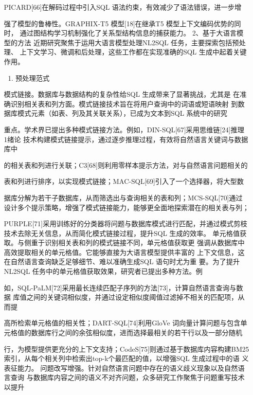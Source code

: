 \documentclass[12pt,a4paper,openright,UTF8]{ctexbook}
\begin{document}
PICARD[66]在解码过程中引入SQL 语法约束，有效减少了语法错误，进一步增

强了模型的鲁棒性。GRAPHIX-T5 模型[18]在继承T5 模型上下文编码优势的同时， 通过图结构学习机制强化了关系型结构信息的捕获能力。 2、基于大语言模型的方法 近期研究聚焦于运用大语言模型处理NL2SQL 任务，主要探索包括预处理、 上下文学习、微调和后处理，这些工作都在实现准确的SQL 生成中起着关键作用。

\begin{enumerate}[label=(\arabic*)]
\item 预处理范式
\end{enumerate}
模式链接。数据库与数据结构的复杂性给SQL 生成带来了显著挑战，尤其是 在准确识别相关表和列方面。模式链接技术旨在将用户查询中的词语或短语映射 到数据库模式元素（如表、列及其关联关系），已成为文本到SQL 系统中的研究

重点。学术界已提出多种模式链接方法。例如，DIN-SQL[67]采用思维链[24]推理 1绪论 技术构建模式链接提示，通过逐步推理过程，有效将自然语言关键词与数据库中

的相关表和列进行关联；C3[68]则利用零样本提示方法，对与自然语言问题相关的

表和列进行排序，以实现模式链接；MAC-SQL[69]引入了一个选择器，将大型数

据库分解为若干子数据库，从而筛选出与查询相关的表和列；MCS-SQL[70]通过 设计多个提示策略，增强了模式链接能力，能够更全面地探索潜在的相关表与列；

PURPLE[71]采用训练好的分类器将问题与数据库模式进行匹配，并通过模式剪枝 技术去除无关信息，从而简化模式链接过程，提升SQL 生成的效率。 单元格值获取。与侧重于识别相关表和列的模式链接不同，单元格值获取更 强调从数据库中高效提取相关的单元格值。它能够直接为大语言模型提供丰富的 上下文信息，这在自然语言查询缺乏足够细节、难以准确生成SQL 语句时尤为重 要。为了提升NL2SQL 任务中的单元格值获取效果，研究者已提出多种方法。例

如，SQL-PaLM[72]采用最长连续匹配子序列的方法[73]，计算自然语言查询与数据 库值之间的关键词相似度，并通过设定相似度阈值过滤掉不相关的匹配项，从而提

高所检索单元格值的相关性；DART-SQL[74]利用GloVe 词向量计算问题与包含单 元格值的数据库行之间的余弦相似度，进而选择最相关的若干行以及一部分随机

行，为模型提供更充分的上下文支持；CodeS[75]则通过基于数据库内容构建BM25 索引，从每个相关列中检索出top-k个最匹配的值，以增强SQL 生成过程中的语 义表征能力。 问题改写增强。针对自然语言问题中存在的语义歧义现象以及自然语言查询 与数据库内容之间的语义不对齐问题，众多研究工作聚焦于问题重写技术以提升
\end{document}
